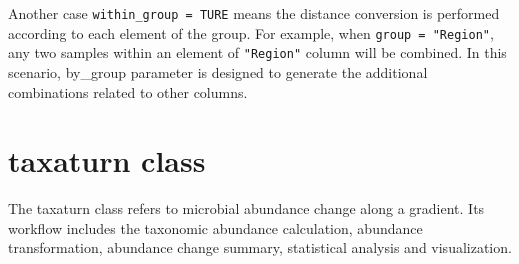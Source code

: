 \documentclass[
]{book}
\newenvironment{Shaded}{\begin{snugshade}}{\end{snugshade}}
\newcommand{\AttributeTok}[1]{\textcolor[rgb]{0.77,0.63,0.00}{#1}}
\newcommand{\CommentTok}[1]{\textcolor[rgb]{0.56,0.35,0.01}{\textit{#1}}}
\newcommand{\ConstantTok}[1]{\textcolor[rgb]{0.00,0.00,0.00}{#1}}
\newcommand{\DecValTok}[1]{\textcolor[rgb]{0.00,0.00,0.81}{#1}}
\newcommand{\FloatTok}[1]{\textcolor[rgb]{0.00,0.00,0.81}{#1}}
\newcommand{\FunctionTok}[1]{\textcolor[rgb]{0.00,0.00,0.00}{#1}}
\newcommand{\NormalTok}[1]{#1}
\newcommand{\OtherTok}[1]{\textcolor[rgb]{0.56,0.35,0.01}{#1}}
\newcommand{\SpecialCharTok}[1]{\textcolor[rgb]{0.00,0.00,0.00}{#1}}
\newcommand{\StringTok}[1]{\textcolor[rgb]{0.31,0.60,0.02}{#1}}
\begin{document}
Another case \texttt{within\_group\ =\ TURE} means the distance conversion is performed according to each element of the group.
For example, when \texttt{group\ =\ "Region"}, any two samples within an element of \texttt{"Region"} column will be combined.
In this scenario, by\_group parameter is designed to generate the additional combinations related to other columns.

\begin{Shaded}
\end{Shaded}

\hypertarget{taxaturn-class}{%
\section{taxaturn class}\label{taxaturn-class}}

The taxaturn class refers to microbial abundance change along a gradient.
Its workflow includes the taxonomic abundance calculation, abundance transformation, abundance change summary, statistical analysis and visualization.
\end{document}
